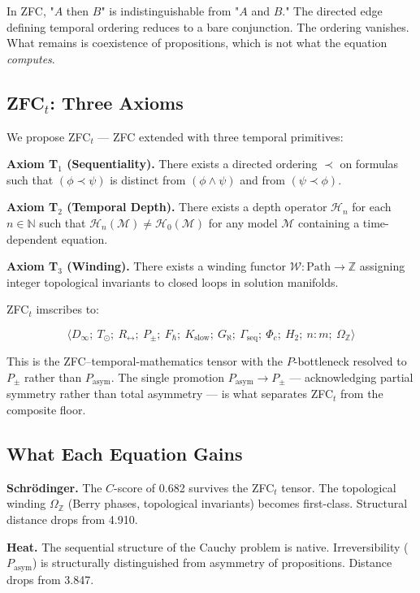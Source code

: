 \documentclass[12pt,a4paper]{article}
\begin{document}
In ZFC, "$A$ then $B$" is indistinguishable from "$A$ and $B$." The directed edge defining temporal ordering reduces to a bare conjunction. The ordering vanishes. What remains is coexistence of propositions, which is not what the equation \emph{computes}.

\subsection{ZFC$_t$: Three Axioms}

We propose ZFC$_t$ --- ZFC extended with three temporal primitives:

\textbf{Axiom T$_1$ (Sequentiality).} There exists a directed ordering $\prec$ on formulas such that $(\phi \prec \psi)$ is distinct from $(\phi \wedge \psi)$ and from $(\psi \prec \phi)$.

\textbf{Axiom T$_2$ (Temporal Depth).} There exists a depth operator $\mathcal{H}_n$ for each $n \in \mathbb{N}$ such that $\mathcal{H}_n(\mathcal{M}) \neq \mathcal{H}_0(\mathcal{M})$ for any model $\mathcal{M}$ containing a time-dependent equation.

\textbf{Axiom T$_3$ (Winding).} There exists a winding functor $\mathcal{W}: \text{Path} \to \mathbb{Z}$ assigning integer topological invariants to closed loops in solution manifolds.

ZFC$_t$ imscribes to:

\[\langle D_{\infty};\ T_{\odot};\ R_{\leftrightarrow};\ P_{\pm};\ F_{\hbar};\ K_\text{slow};\ G_{\aleph};\ \Gamma_\text{seq};\ \Phi_c;\ H_2;\ n{:}m;\ \Omega_\mathbb{Z} \rangle\]

This is the ZFC--temporal-mathematics tensor with the $P$-bottleneck resolved to $P_{\pm}$ rather than $P_\text{asym}$. The single promotion $P_\text{asym} \to P_{\pm}$ --- acknowledging partial symmetry rather than total asymmetry --- is what separates ZFC$_t$ from the composite floor.

\subsection{What Each Equation Gains}

\textbf{Schrödinger.} The $C$-score of 0.682 survives the ZFC$_t$ tensor. The topological winding $\Omega_\mathbb{Z}$ (Berry phases, topological invariants) becomes first-class. Structural distance drops from 4.910.

\textbf{Heat.} The sequential structure of the Cauchy problem is native. Irreversibility ($P_\text{asym}$) is structurally distinguished from asymmetry of propositions. Distance drops from 3.847.
\end{document}
